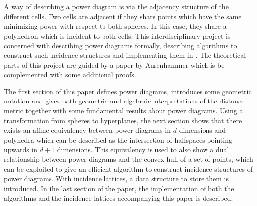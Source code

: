 A way of describing a power diagram is via the adjacency structure of the different cells.
Two cells are adjacent if they share points which have the same minimizing power with respect to both spheres.
In this case, they share a polyhedron which is incident to both cells.
This interdisciplinary project is concerned with describing power diagrams formally, describing algorithms to construct such incidence structures and implementing them in \CC.
The theoretical parts of this project are guided by a paper by Aurenhammer \cite{aurenhammer1987power} which is be complemented with some additional proofs.

The first section of this paper defines power diagrams, introduces some geometric notation and gives both geometric and algebraic interpretations of the distance metric together with some fundamental results about power diagrams.
Using a transformation from spheres to hyperplanes, the next section shows that there exists an affine equivalency between power diagrams in $d$ dimensions and polyhedra which can be described as the intersection of halfspaces pointing upwards in $d+1$ dimensions.
This equivalency is used to also show a dual relationship between power diagrams and the convex hull of a set of points, which can be exploited to give an efficient algorithm to construct incidence structures of power diagrams.
With incidence lattices, a data structure to store them is introduced.
In the last section of the paper, the implementation of both the algorithms and the incidence lattices accompanying this paper is described.

